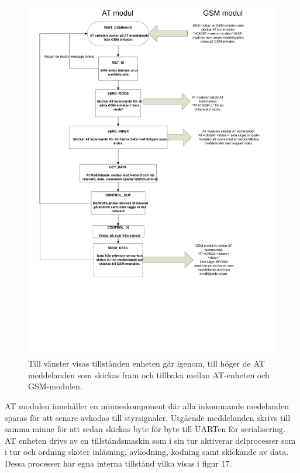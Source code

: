 \documentclass[a4paper]{scrartcl}
\begin{document}
		\begin{figure}[H]
			\centering
			\includegraphics[scale=0.4]{atflow.pdf}
			\caption{Till vänster visas tillstånden enheten går igenom, till höger de AT meddelanden som skickas fram och tillbaka mellan AT-enheten och GSM-modulen.}
		\end{figure}
		
		AT modulen innehåller en minneskomponent där alla inkommande medelanden sparas för att senare avkodas till styrsignaler. Utgående meddelanden skrivs till samma minne för att sedan skickas byte för byte till UARTen för serialisering.
		AT enheten drivs av en tillståndsmaskin som i sin tur aktiverar delprocesser som i tur och ordning sköter inläsning, avkodning, kodning samt skickande av data. Dessa processer har egna interna tillstånd vilka visas i figur 17.
\end{document}
